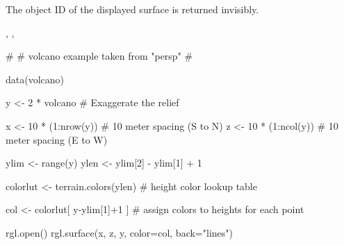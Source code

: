 \begin{Value}
The object ID of the displayed surface is returned invisibly.
\end{Value}
\begin{SeeAlso}\relax
{}, , 
\end{SeeAlso}
\begin{Examples}
\begin{ExampleCode}

#
# volcano example taken from "persp"
#

data(volcano)

y <- 2 * volcano        # Exaggerate the relief

x <- 10 * (1:nrow(y))   # 10 meter spacing (S to N)
z <- 10 * (1:ncol(y))   # 10 meter spacing (E to W)

ylim <- range(y)
ylen <- ylim[2] - ylim[1] + 1

colorlut <- terrain.colors(ylen) # height color lookup table

col <- colorlut[ y-ylim[1]+1 ] # assign colors to heights for each point

rgl.open()
rgl.surface(x, z, y, color=col, back="lines")

\end{ExampleCode}
\end{Examples}

